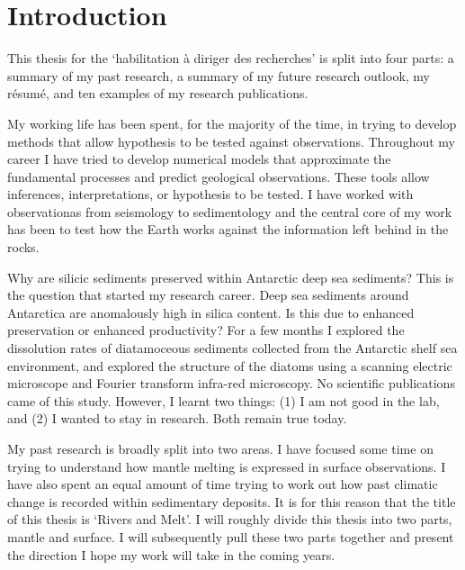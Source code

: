 \chapter{Introduction}

This thesis for the `habilitation à diriger des recherches' is split into four parts: a summary of my past research, a summary of my future research outlook, my résumé, and ten examples of my research publications.

My working life has been spent, for the majority of the time, in trying to develop methods that allow hypothesis to be tested against observations. Throughout my career I have tried to develop numerical models that approximate the fundamental processes and predict geological observations. These tools allow inferences, interpretations, or hypothesis to be tested. I have worked with observationas from seismology to sedimentology and the central core of my work has been to test how the Earth works against the information left behind in the rocks.

Why are silicic sediments preserved within Antarctic deep sea sediments? This is the question that started my research career. Deep sea sediments around Antarctica are anomalously high in silica content. Is this due to enhanced preservation or enhanced productivity? For a few months I explored the dissolution rates of diatamoceous sediments collected from the Antarctic shelf sea environment, and explored the structure of the diatoms using a scanning electric microscope and Fourier transform infra-red microscopy. No scientific publications came of this study. However, I learnt two things: (1) I am not good in the lab, and (2) I wanted to stay in research. Both remain true today.

My past research is broadly split into two areas. I have focused some time on trying to understand how mantle melting is expressed in surface observations. I have also spent an equal amount of time trying to work out how past climatic change is recorded within sedimentary deposits. It is for this reason that the title of this thesis is `Rivers and Melt'. I will roughly divide this thesis into two parts, mantle and surface. I will subsequently pull these two parts together and present the direction I hope my work will take in the coming years.

